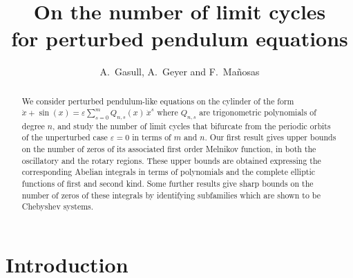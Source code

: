 \documentclass[12pt,psamsfonts]{amsart}
\begin{document}
\title[limit cycles for perturbed pendulum equations]
{On the number of limit cycles\\ for perturbed pendulum equations}
\author{A.~Gasull, A.~Geyer  and F.~Ma\~{n}osas }

\address{Departament de Matem\`{a}tiques,
Universitat Aut\`{o}noma de Barcelona, 08193 Bellaterra, Barcelona, Spain; \newline $\phantom{x\;}$ Faculty of Mathematics,
University of Vienna, \mbox{Oskar-Morgenstern-Platz 1}, 1090 Vienna, Austria;}  \date{}



\maketitle

\begin{abstract}
We consider perturbed pendulum-like equations on the cylinder of the form $  \ddot x+\sin(x)= \varepsilon
\sum_{{s}=0}^{m}{Q_{n,{s}} (x)\, \dot x^{s}}$ where $Q_{n,{s}}$ are trigonometric polynomials of
degree $n$, and  study  the number  of limit cycles that bifurcate from
the periodic orbits of the unperturbed case $\varepsilon=0$ in terms of $m$ and $n$. Our first result gives
upper bounds on the
number of zeros of its associated first order Melnikov function, in both the oscillatory and the
rotary regions. These upper bounds are obtained expressing the corresponding Abelian integrals in
terms of polynomials and the complete elliptic functions of first and second kind. Some further
results give sharp bounds on the number of zeros of these integrals by identifying subfamilies which
are shown to be Chebyshev systems.
\end{abstract}

\setcounter{tocdepth}{2}

\section{Introduction}
\end{document}

